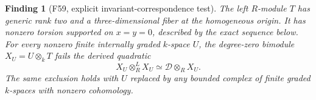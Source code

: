 \documentclass[11pt,a4paper]{article}
\newcommand{\mathscr}{\mathcal}
\newcommand{\fid}[1]{\textsf{#1}}\newcommand{\gate}[1]{\textsf{#1}}
\theoremstyle{named}\newtheorem{finding}{Finding}[section]
\theoremstyle{definition}\newtheorem{definition}[finding]{Definition}
\theoremstyle{remark}\newtheorem{remark}[finding]{Remark}
\begin{document}
\begin{finding}[\fid{F59}, explicit invariant-correspondence test]
\label{f:invariantcorrespondencetest}
The left \(R\)-module \(T\) has generic rank two and a
three-dimensional fiber at the homogeneous origin. It has
nonzero torsion supported on \(x=y=0\), described by the exact
sequence below. For every nonzero finite internally graded
\(k\)-space \(U\), the degree-zero bimodule
\(X_U=U\otimes_kT\) fails the derived quadratic
\begin{equation}\label{eq:invariantderivedquadratic}
 X_U\otimes_R^L X_U\simeq\mathscr D\otimes_R X_U.
\end{equation}
The same exclusion holds with \(U\) replaced by any bounded
complex of finite graded \(k\)-spaces with nonzero cohomology.
\end{finding}
\end{document}
